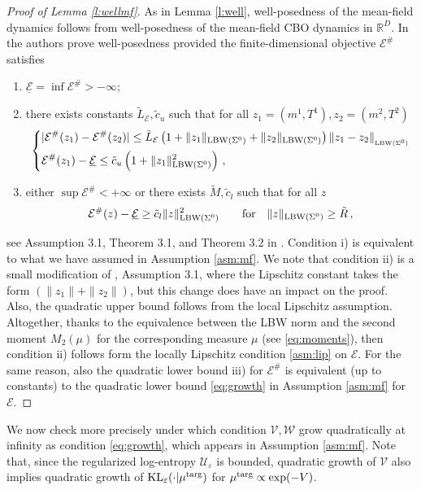 \documentclass{article}
\theoremstyle{plain}
\theoremstyle{definition}
\theoremstyle{remark}
\newcommand{\R}{ \mathbb{R}}
\newcommand{\E}{\mathcal{E}}
\newcommand{\ve}{\varepsilon}
\newcommand{\KL}{\textup{KL}}
\newcommand{\targ}{\textup{targ}}
\begin{document}
\begin{proof}[Proof of Lemma \ref{l:wellmf}]
As in Lemma \ref{l:well}, well-posedness of the mean-field dynamics follows from well-posedness of the mean-field CBO dynamics in $\R^D$. In \cite{carrillo2021consensus} the authors prove well-posedness provided the finite-dimensional objective $\E^\#$ satisfies
\begin{enumerate}[label=\roman*)]
\item  $\underline{\E} = \inf \E^\# > -\infty$;
\item  there exists constants $\tilde{L}_{\E}, \tilde{c}_u$ such that for all $z_1 =(m^1, T^1), z_2 = (m^2, T^2)$
\begin{equation*}
\begin{dcases}
|\E^\#(z_1) - \E^\#(z_2)|  \leq \tilde{L}_{\E}\left(1 + \| z_1 \|_{\textup{LBW}(\Sigma^0)} + \|z_2\|_{\textup{LBW}(\Sigma^0)}\right ) \|z_1 - z_2 \|_{_{\textup{LBW}(\Sigma^0)}} \\
\E^{\#}(z_1) - \underline{\E} \leq \tilde{c}_u\left(1 + \|z_1\|^2_{\textup{LBW}(\Sigma^0)} \right) \,,
\end{dcases}
\end{equation*}
\item either $\sup\E^{\#}<+\infty$ or there exists $\tilde{M}, \tilde{c}_l$ such that for all $z$
\[
\E^\#(z) - \underline{\E} \geq \tilde{c}_l \| z \|^2_{\textup{LBW}(\Sigma^0)} \qquad \textup{for}\quad \|z\|_{\textup{LBW}(\Sigma^0)} \geq \tilde{R}\,,
\]
\end{enumerate}
see Assumption 3.1, Theorem 3.1, and Theorem 3.2 in \cite{carrillo2021consensus}. Condition i) is equivalent to what we have assumed in Assumption \ref{asm:mf}. 
We note that condition ii) is a small modification of \cite{carrillo2021consensus}, Assumption 3.1, where  the Lipschitz constant takes the form $(\|z_1\| + \|z_2\|)$, but
this change does have an impact on the proof. Also, the quadratic upper bound follows from the local Lipschitz assumption. Altogether, thanks to the equivalence between the LBW norm and the second moment $M_2(\mu)$ for the corresponding measure $\mu$ (see \eqref{eq:moments}), then condition ii) follows form the locally Lipschitz condition \eqref{asm:lip} on $\E$. For the same reason, also the quadratic lower bound iii) for $\E^\#$ is equivalent (up to constants) to the quadratic lower bound \eqref{eq:growth} in Assumption \ref{asm:mf} for $\E$.
\end{proof}

We now check more precisely under which condition $\mathcal{V}, \mathcal{W}$ grow quadratically at infinity as condition \eqref{eq:growth}, which appears in Assumption \ref{asm:mf}.
Note that, since the regularized log-entropy  $\mathcal{U}_\ve$ is bounded, quadratic growth of  $\mathcal{V}$
also implies quadratic growth of $\KL_\ve(\cdot |\mu^\targ)$ for $\mu^\targ \propto \exp(-V)$.
\end{document}
